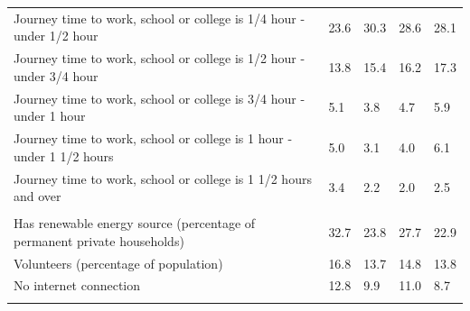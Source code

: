 \documentclass{article}
\begin{document}
\begin{table}[h]
\begin{tabular}{KTTTT}
Journey time to work, school or college is 1/4 hour - under 1/2 hour & 23.6& 30.3& 28.6& 28.1\\
Journey time to work, school or college is 1/2 hour - under 3/4 hour & 13.8& 15.4& 16.2& 17.3\\
Journey time to work, school or college is 3/4 hour - under 1 hour & 5.1& 3.8& 4.7& 5.9\\
Journey time to work, school or college is 1 hour - under 1 1/2 hours & 5.0& 3.1& 4.0& 6.1\\
Journey time to work, school or college is 1 1/2 hours and over & 3.4& 2.2& 2.0& 2.5\\
\hline
    \\ 
    \hline
Has renewable energy source (percentage of permanent private households) & 32.7& 23.8& 27.7& 22.9\\
    \hline
Volunteers (percentage of population) & 16.8& 13.7& 14.8& 13.8\\
    \hline
No internet connection& 12.8&  9.9& 11.0&  8.7\\
\hline
\end{tabular}
\end{table}
\end{document}

